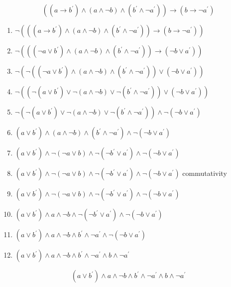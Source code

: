 \documentclass[a4paper, 13pt, draft]{report}
\begin{document}
	\[ ((a \rightarrow b^\prime) \wedge (a \wedge \neg b) \wedge (b^\prime \wedge \neg a^\prime)) \rightarrow (b \rightarrow \neg a^\prime) \]

	\hline 
	  
	\begin{enumerate}		
		\item  $ \neg (((a \rightarrow b^\prime) \wedge (a \wedge \neg b) \wedge (b^\prime \wedge \neg a^\prime)) \rightarrow (b \rightarrow \neg a^\prime)) $
		\item  $ \neg (((\neg a \vee b^\prime) \wedge (a \wedge \neg b) \wedge (b^\prime \wedge \neg a^\prime)) \rightarrow (\neg b \vee a^\prime)) $
		\item  $ \neg (\neg ((\neg a \vee b^\prime) \wedge (a \wedge \neg b) \wedge (b^\prime \wedge \neg a^\prime)) \vee (\neg b \vee a^\prime)) $
		\item  $ \neg ((\neg (a \vee b^\prime) \vee \neg (a \wedge \neg b) \vee \neg (b^\prime \wedge \neg a^\prime)) \vee (\neg b \vee a^\prime)) $ 
		\item  $ \neg (\neg (a \vee b^\prime) \vee \neg (a \wedge \neg b) \vee \neg (b^\prime \wedge \neg a^\prime)) \wedge \neg (\neg b \vee a^\prime) $ 
		\item  $ (a \vee b^\prime) \wedge (a \wedge \neg b) \wedge (b^\prime \wedge \neg a^\prime) \wedge \neg (\neg b \vee a^\prime) $ 
		\item  $ (a \vee b^\prime) \wedge \neg (\neg a \vee b) \wedge \neg (\neg b^\prime \vee a^\prime) \wedge \neg (\neg b \vee a^\prime) $
		\item  $ (a \vee b^\prime) \wedge \neg (\neg a \vee b) \wedge \neg (\neg b^\prime \vee a^\prime) \wedge \neg (\neg b \vee a^\prime) $ commutativity
		\item $ (a \vee b^\prime) \wedge \neg (\neg a \vee b) \wedge \neg (\neg b^\prime \vee a^\prime) \wedge \neg (\neg b \vee a^\prime) $
		\item $ (a \vee b^\prime) \wedge a \wedge \neg b \wedge \neg (\neg b^\prime \vee a^\prime) \wedge \neg (\neg b \vee a^\prime) $
		\item $ (a \vee b^\prime) \wedge a \wedge \neg b \wedge b^\prime \wedge \neg a^\prime \wedge \neg (\neg b \vee a^\prime) $
		\item $ (a \vee b^\prime) \wedge a \wedge \neg b \wedge b^\prime \wedge \neg a^\prime \wedge b \wedge \neg a^\prime $
	\end{enumerate}	
	\hline
	\[ (a \vee b^\prime) \wedge a \wedge \neg b \wedge b^\prime \wedge \neg a^\prime \wedge b \wedge \neg a^\prime \]
\end{document}
